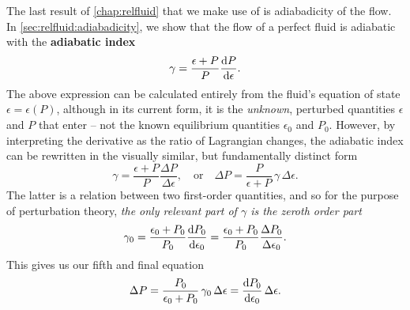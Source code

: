 The last result of \cref{chap:relfluid} that we make use of is adiabadicity of the flow.
In \cref{sec:relfluid:adiabadicity}, we show that the flow of a perfect fluid is adiabatic with the \textbf{adiabatic index}
\begin{equation}
	\gamma = \frac{\epsilon+P}{P} \odv{P}{\epsilon} .
\label{eq:nstars:adiabatic_index0}
\end{equation}
The above expression can be calculated entirely from the fluid's equation of state $\epsilon = \epsilon(P)$, although in its current form, it is the \emph{unknown}, perturbed quantities $\epsilon$ and $P$ that enter -- not the known equilibrium quantities $\epsilon_0$ and $P_0$.
However, by interpreting the derivative as the ratio of Lagrangian changes, the adiabatic index can be rewritten in the visually similar, but fundamentally distinct form
\begin{equation}
	\gamma = 
	\frac{\epsilon+P}{P} \frac{\Delta P}{\Delta \epsilon} ,
	\quad \text{or} \quad
	\Delta P = \frac{P}{\epsilon + P} \, \gamma \, \Delta \epsilon .
\label{eq:nstars:adiabatic_index}
\end{equation}
The latter is a relation between two first-order quantities, and so for the purpose of perturbation theory, \emph{the only relevant part of $\gamma$ is the zeroth order  part}
\begin{equation}
	\gamma_0 = \frac{\epsilon_0+P_0}{P_0} \odv{P_0}{\epsilon_0}
	         = \frac{\epsilon_0+P_0}{P_0} \frac{\Delta P_0}{\Delta \epsilon_0} .
\end{equation}
This gives us our fifth and final equation
\begin{equation}
	\Delta P = \frac{P_0}{\epsilon_0 + P_0} \, \gamma_0 \, \Delta \epsilon
	         = \odv{P_0}{\epsilon_0} \, \Delta\epsilon .
\label{eq:nstars:Delta_P}
\end{equation}

